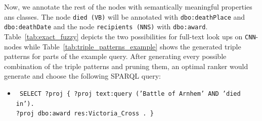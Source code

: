 Now, we annotate the rest of the nodes with semantically meaningful properties ans classes. 
The node \texttt{died (VB)} will be annotated with \texttt{dbo:deathPlace} and \texttt{dbo:deathDate} and the node \texttt{recipients (NNS)} with \texttt{dbo:award}.
Table~\ref{tab:exact_fuzzy} depicts the two possibilities for full-text look ups on \texttt{CNN}-nodes while Table~\ref{tab:triple_patterns_example} shows the generated triple patterns for parts of the example query.
After generating every possible combination of the triple patterns and pruning them, an optimal ranker would generate and choose the following SPARQL query:
\begin{itemize}
\item \texttt{
SELECT ?proj \{
?proj text:query ('Battle of Arnhem' AND 'died in').\\ 
?proj  dbo:award res:Victoria\_Cross . \}}
\end{itemize}

